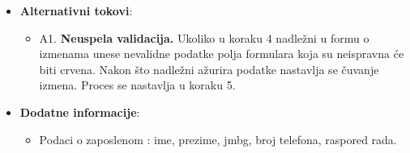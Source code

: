 \begin{itemize}
  \item \textbf{Alternativni tokovi}:
      \begin{itemize}
        \item A1. \textbf{Neuspela validacija.}
        Ukoliko u koraku 4 nadležni u formu o izmenama unese nevalidne podatke polja formulara koja su neispravna će biti crvena.
        Nakon što nadležni ažurira podatke nastavlja se čuvanje izmena. Proces se nastavlja u koraku 5.
      \end{itemize}

      
  \item \textbf{Dodatne informacije}:
      \begin{itemize}
        \item Podaci o zaposlenom : ime, prezime, jmbg, broj telefona, raspored rada.
      \end{itemize}
\end{itemize}